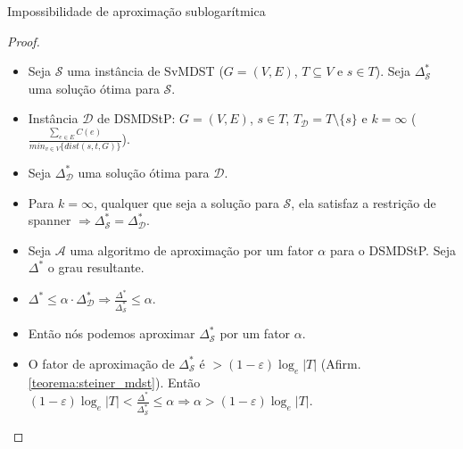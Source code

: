 \documentclass[10pt]{beamer}
\begin{document}
\begin{frame}{Impossibilidade de aproximação sublogarítmica \hyperlink{not_approximable}{}}
\hypertarget{not_approximable_slide}{}
  \begin{proof}%
    \begin{itemize}
      \item <1-> Seja $\mathcal{S}$ uma instância de SvMDST ($G = (V,E)$, $T \subseteq V$ e $s \in T$). Seja $\Delta_\mathcal{S}^*$ uma solução ótima para $\mathcal{S}$. 
      \item <2-> Instância $\mathcal{D}$ de DSMDStP: $G = (V,E)$, $s \in T$, $T_\mathcal{D} = T \setminus \lbrace s \rbrace$ e $k=\infty$ ($\frac{\sum_{e \in E} C(e)}{min_{v\in V}\{dist(s,t,G)\}}$).
      \item <3-> Seja $\Delta_\mathcal{D}^*$ uma solução ótima para $\mathcal{D}$.
      \item <4-> Para $k=\infty$, qualquer que seja a solução para $\mathcal{S}$, ela satisfaz a restrição de spanner $\Longrightarrow \Delta_\mathcal{S}^* = \Delta_\mathcal{D}^*$.
      \item <5-> Seja $\mathcal{A}$ uma algoritmo de aproximação por um fator $\alpha$ para o DSMDStP. Seja $\Delta^*$ o grau resultante.
      \item <6-> $\Delta^* \le \alpha \cdot \Delta_\mathcal{D}^* \Longrightarrow \frac{\Delta^*}{\Delta_\mathcal{S}^*} \le \alpha$.
      \item <7-> Então nós podemos aproximar $\Delta_\mathcal{S}^*$ por um fator $\alpha$.
      \item <8-> O fator de aproximação de $\Delta_\mathcal{S}^*$ é $ > (1-\varepsilon)\log_e |T|$ (Afirm. \ref{teorema:steiner_mdst}). Então $(1-\varepsilon)\log_e |T| < \frac{\Delta^*}{\Delta_\mathcal{S}^*} \leq \alpha \Longrightarrow \alpha > (1-\varepsilon)\log_e |T|$.
    \end{itemize}
  \end{proof}
\end{frame}
\end{document}

